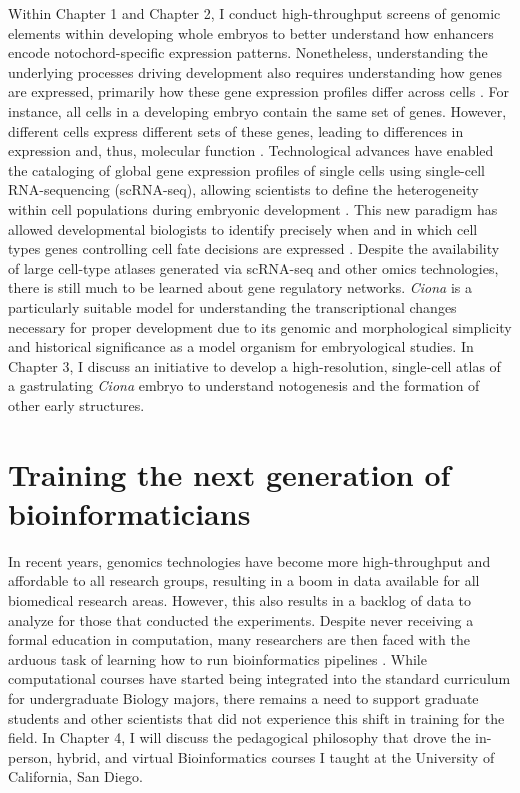 \begin{dissertationintroduction}
    Within Chapter 1 and Chapter 2, I conduct high-throughput screens of genomic elements within developing whole embryos to better understand how enhancers encode notochord-specific expression patterns. Nonetheless, understanding the underlying processes driving development also requires understanding how genes are expressed, primarily how these gene expression profiles differ across cells \cite{peter2011}. For instance, all cells in a developing embryo contain the same set of genes. However, different cells express different sets of these genes, leading to differences in expression and, thus, molecular function \cite{arnone1997, peter2011}. Technological advances have enabled the cataloging of global gene expression profiles of single cells using single-cell RNA-sequencing (scRNA-seq), allowing scientists to define the heterogeneity within cell populations during embryonic development \cite{klein2015a, macosko2015, olsen2018}. This new paradigm has allowed developmental biologists to identify precisely when and in which cell types genes controlling cell fate decisions are expressed \cite{klein2019}. Despite the availability of large cell-type atlases generated via scRNA-seq and other omics technologies, there is still much to be learned about gene regulatory networks. \textit{Ciona} is a particularly suitable model for understanding the transcriptional changes necessary for proper development due to its genomic and morphological simplicity and historical significance as a model organism for embryological studies. In Chapter 3, I discuss an initiative to develop a high-resolution, single-cell atlas of a gastrulating \textit{Ciona} embryo to understand notogenesis and the formation of other early structures.  
    
    \section{Training the next generation of bioinformaticians}

    In recent years, genomics technologies have become more high-throughput and affordable to all research groups, resulting in a boom in data available for all biomedical research areas. However, this also results in a backlog of data to analyze for those that conducted the experiments. Despite never receiving a formal education in computation, many researchers are then faced with the arduous task of learning how to run bioinformatics pipelines \cite{barone2017, stephens2015}. While computational courses have started being integrated into the standard curriculum for undergraduate Biology majors, there remains a need to support graduate students and other scientists that did not experience this shift in training for the field. In Chapter 4, I will discuss the pedagogical philosophy that drove the in-person, hybrid, and virtual Bioinformatics courses I taught at the University of California, San Diego. 


\end{dissertationintroduction}
